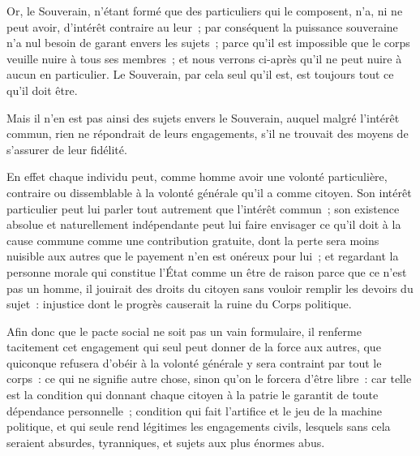 \documentclass[french,twoside]{book} %
\begin{document}
Or, le Souverain, n’étant formé que des particuliers qui le composent, n’a, ni ne peut avoir, d’intérêt contraire au leur ; par conséquent la puissance souveraine n’a nul besoin de garant envers les sujets ; parce qu’il est impossible que le corps veuille nuire à tous ses membres ; et nous verrons ci-après qu’il ne peut nuire à aucun en particulier. Le Souverain, par cela seul qu’il est, est toujours tout ce qu’il doit être.\par
Mais il n’en est pas ainsi des sujets envers le Souverain, auquel malgré l’intérêt commun, rien ne répondrait de leurs engagements, s’il ne trouvait des moyens de s’assurer de leur fidélité.\par
En effet chaque individu peut, comme homme avoir une volonté particulière, contraire ou dissemblable à la volonté générale qu’il a comme citoyen. Son intérêt particulier peut lui parler tout autrement que l’intérêt commun ; son existence absolue et naturellement indépendante peut lui faire envisager ce qu’il doit à la cause commune comme une contribution gratuite, dont la perte sera moins nuisible aux autres que le payement n’en est onéreux pour lui ; et regardant la personne morale qui constitue l’État comme un être de raison parce que ce n’est pas un homme, il jouirait des droits du citoyen sans vouloir remplir les devoirs du sujet : injustice dont le progrès causerait la ruine du Corps politique.\par
Afin donc que le pacte social ne soit pas un vain formulaire, il renferme tacitement cet engagement qui seul peut donner de la force aux autres, que quiconque refusera d’obéir à la volonté générale y sera contraint par tout le corps : ce qui ne signifie autre chose, sinon qu’on le forcera d’être libre : car telle est la condition qui donnant chaque citoyen à la patrie le garantit de toute dépendance personnelle ; condition qui fait l’artifice et le jeu de la machine politique, et qui seule rend légitimes les engagements civils, lesquels sans cela seraient absurdes, tyranniques, et sujets aux plus énormes abus.
\end{document}
